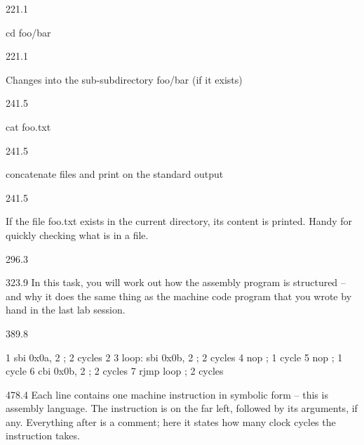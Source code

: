 \documentclass{aslab}
\makeatletter
\newcommand*\aN[1]{\textcolor{codeorange}{#1}}%
\newcommand*\aI[1]{\textcolor{codegreen}{#1}}%
\newcommand*\aK[1]{\textcolor{codered}{#1}}%
\newcommand*\aR[1]{\textcolor{codecyan}{#1}}%
\newcommand*\aC[1]{\textcolor{codepurple}{#1}}%
\newenvironment{asmlisting}{\par\ttfamily\asm@setup}{\par}
\newcommand*\cell{\small\baselineskip=12bp\raggedright}
\makeatother
\begin{document}
\begin{region}[x=61.0,width=68,free]{221.1}\cell cd foo/bar\end{region}
\begin{region}[x=256.1,width=278,free]{221.1}\cell
Changes into the sub-subdirectory foo/bar (if it exists)
\end{region}

\begin{region}[x=61.0,width=68,free]{241.5}\cell cat foo.txt\end{region}
\begin{region}[x=137.8,width=110,free]{241.5}\cell
concatenate files and print on the standard output
\end{region}
\begin{region}[x=256.1,width=278,free]{241.5}\cell
If the file foo.txt exists in the current directory, its content is
printed. Handy for quickly checking what is in a file.
\end{region}


\begin{region}{296.3}
\end{region}

\begin{region}[width=344,pitch=13.17]{323.9}
In this task, you will work out how the assembly program is structured --
and why it does the same thing as the machine code program that you wrote
by hand in the last lab session.
\end{region}

\begin{region}{389.8}
\begin{asmlisting}
\aN{1}         \aI{sbi}     \aK{0x0a}, \aK{2}     \aC{; 2 cycles}
\aN{2}
\aN{3 loop}:   \aI{sbi}     \aK{0x0b}, \aK{2}     \aC{; 2 cycles}
\aN{4}         \aI{nop}                 \aC{; 1 cycle}
\aN{5}         \aI{nop}                 \aC{; 1 cycle}
\aN{6}         \aI{cbi}     \aK{0x0b}, \aK{2}     \aC{; 2 cycles}
\aN{7}         \aI{rjmp}    \aR{loop}        \aC{; 2 cycles}
\end{asmlisting}
\end{region}

\begin{region}[width=344,pitch=12.1]{478.4}
Each line contains one machine instruction in symbolic form -- this is
assembly language. The instruction is on the far left, followed by its
arguments, if any. Everything after \code{;} is a comment; here it states
how many clock cycles the instruction takes.
\end{region}
\end{document}
